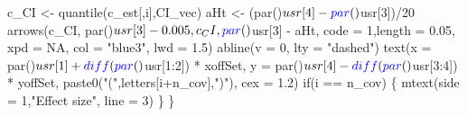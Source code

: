 \documentclass[
  11pt,
]{article}
\newenvironment{Shaded}{}{}
\newcommand{\ControlFlowTok}[1]{\textcolor[rgb]{0.00,0.00,1.00}{#1}}
\newcommand{\DataTypeTok}[1]{#1}
\newcommand{\DecValTok}[1]{#1}
\newcommand{\FloatTok}[1]{#1}
\newcommand{\KeywordTok}[1]{\textcolor[rgb]{0.00,0.00,1.00}{#1}}
\newcommand{\NormalTok}[1]{#1}
\newcommand{\OperatorTok}[1]{#1}
\newcommand{\OtherTok}[1]{\textcolor[rgb]{1.00,0.25,0.00}{#1}}
\newcommand{\StringTok}[1]{\textcolor[rgb]{0.00,0.50,0.50}{#1}}
\begin{document}
\begin{Shaded}
\begin{Highlighting}[]
\NormalTok{  c_CI <-}\StringTok{ }\KeywordTok{quantile}\NormalTok{(c_est[,i],CI_vec)}
\NormalTok{  aHt <-}\StringTok{ }\NormalTok{(}\KeywordTok{par}\NormalTok{()}\OperatorTok{$}\NormalTok{usr[}\DecValTok{4}\NormalTok{]}\OperatorTok{-}\KeywordTok{par}\NormalTok{()}\OperatorTok{$}\NormalTok{usr[}\DecValTok{3}\NormalTok{])}\OperatorTok{/}\DecValTok{20}
  \KeywordTok{arrows}\NormalTok{(c_CI, }\KeywordTok{par}\NormalTok{()}\OperatorTok{$}\NormalTok{usr[}\DecValTok{3}\NormalTok{]}\OperatorTok{-}\FloatTok{0.005}\NormalTok{, c_CI, }\KeywordTok{par}\NormalTok{()}\OperatorTok{$}\NormalTok{usr[}\DecValTok{3}\NormalTok{] }\OperatorTok{-}\StringTok{ }\NormalTok{aHt,}
         \DataTypeTok{code =} \DecValTok{1}\NormalTok{,}\DataTypeTok{length =} \FloatTok{0.05}\NormalTok{, }\DataTypeTok{xpd =} \OtherTok{NA}\NormalTok{, }\DataTypeTok{col =} \StringTok{"blue3"}\NormalTok{, }\DataTypeTok{lwd =} \FloatTok{1.5}\NormalTok{)}
  \KeywordTok{abline}\NormalTok{(}\DataTypeTok{v =} \DecValTok{0}\NormalTok{, }\DataTypeTok{lty =} \StringTok{"dashed"}\NormalTok{)}
  \KeywordTok{text}\NormalTok{(}\DataTypeTok{x =} \KeywordTok{par}\NormalTok{()}\OperatorTok{$}\NormalTok{usr[}\DecValTok{1}\NormalTok{] }\OperatorTok{+}\StringTok{ }\KeywordTok{diff}\NormalTok{(}\KeywordTok{par}\NormalTok{()}\OperatorTok{$}\NormalTok{usr[}\DecValTok{1}\OperatorTok{:}\DecValTok{2}\NormalTok{]) }\OperatorTok{*}\StringTok{ }\NormalTok{xoffSet,}
       \DataTypeTok{y =} \KeywordTok{par}\NormalTok{()}\OperatorTok{$}\NormalTok{usr[}\DecValTok{4}\NormalTok{] }\OperatorTok{-}\StringTok{ }\KeywordTok{diff}\NormalTok{(}\KeywordTok{par}\NormalTok{()}\OperatorTok{$}\NormalTok{usr[}\DecValTok{3}\OperatorTok{:}\DecValTok{4}\NormalTok{]) }\OperatorTok{*}\StringTok{ }\NormalTok{yoffSet,}
       \KeywordTok{paste0}\NormalTok{(}\StringTok{"("}\NormalTok{,letters[i}\OperatorTok{+}\NormalTok{n_cov],}\StringTok{")"}\NormalTok{),}
       \DataTypeTok{cex =} \FloatTok{1.2}\NormalTok{)}
  \ControlFlowTok{if}\NormalTok{(i }\OperatorTok{==}\StringTok{ }\NormalTok{n_cov) \{ }\KeywordTok{mtext}\NormalTok{(}\DataTypeTok{side =} \DecValTok{1}\NormalTok{,}\StringTok{"Effect size"}\NormalTok{, }\DataTypeTok{line =} \DecValTok{3}\NormalTok{) \}}
\NormalTok{\}}
\end{Highlighting}
\end{Shaded}
\end{document}
